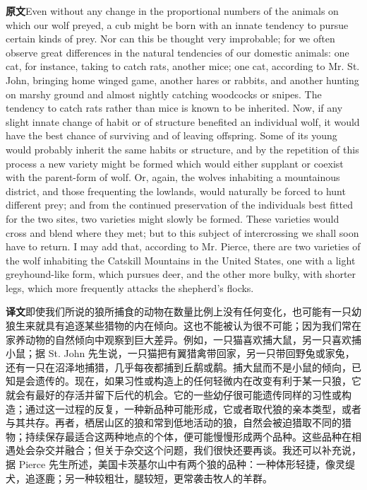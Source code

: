 \documentclass[UTF8,zihao=-4]{ctexart}
\newcommand{\BodyFont}{\fontsize{10.5pt}{15.5pt}\selectfont}
\newcommand{\origlabel}{\textbf{原文}\quad}
\newcommand{\translabel}{\textbf{译文}\quad}
\newenvironment{enblock}{\par\noindent\begingroup\BodyFont\origlabel}{\par\endgroup}
\newenvironment{zhblock}{\par\noindent\begingroup\BodyFont\translabel}{\par\endgroup\vspace{0.35em}}
\newcommand{\pair}[2]{\begin{enblock}#1\end{enblock}\begin{zhblock}#2\end{zhblock}}
\begin{document}
\pair{Even without any change in the proportional numbers of the animals on which our wolf preyed, a cub might be born with an innate tendency to pursue certain kinds of prey. Nor can this be thought very improbable; for we often observe great differences in the natural tendencies of our domestic animals: one cat, for instance, taking to catch rats, another mice; one cat, according to Mr. St. John, bringing home winged game, another hares or rabbits, and another hunting on marshy ground and almost nightly catching woodcocks or snipes. The tendency to catch rats rather than mice is known to be inherited. Now, if any slight innate change of habit or of structure benefited an individual wolf, it would have the best chance of surviving and of leaving offspring. Some of its young would probably inherit the same habits or structure, and by the repetition of this process a new variety might be formed which would either supplant or coexist with the parent-form of wolf. Or, again, the wolves inhabiting a mountainous district, and those frequenting the lowlands, would naturally be forced to hunt different prey; and from the continued preservation of the individuals best fitted for the two sites, two varieties might slowly be formed. These varieties would cross and blend where they met; but to this subject of intercrossing we shall soon have to return. I may add that, according to Mr. Pierce, there are two varieties of the wolf inhabiting the Catskill Mountains in the United States, one with a light greyhound-like form, which pursues deer, and the other more bulky, with shorter legs, which more frequently attacks the shepherd's flocks.}{即使我们所说的狼所捕食的动物在数量比例上没有任何变化，也可能有一只幼狼生来就具有追逐某些猎物的内在倾向。这也不能被认为很不可能；因为我们常在家养动物的自然倾向中观察到巨大差异。例如，一只猫喜欢捕大鼠，另一只喜欢捕小鼠；据 St. John 先生说，一只猫把有翼猎禽带回家，另一只带回野兔或家兔，还有一只在沼泽地捕猎，几乎每夜都捕到丘鹬或鹬。捕大鼠而不是小鼠的倾向，已知是会遗传的。现在，如果习性或构造上的任何轻微内在改变有利于某一只狼，它就会有最好的存活并留下后代的机会。它的一些幼仔很可能遗传同样的习性或构造；通过这一过程的反复，一种新品种可能形成，它或者取代狼的亲本类型，或者与其共存。再者，栖居山区的狼和常到低地活动的狼，自然会被迫猎取不同的猎物；持续保存最适合这两种地点的个体，便可能慢慢形成两个品种。这些品种在相遇处会杂交并融合；但关于杂交这个问题，我们很快还要再谈。我还可以补充说，据 Pierce 先生所述，美国卡茨基尔山中有两个狼的品种：一种体形轻捷，像灵缇犬，追逐鹿；另一种较粗壮，腿较短，更常袭击牧人的羊群。}
\end{document}
